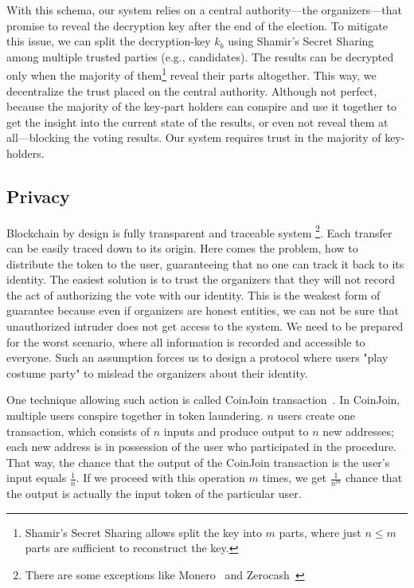 \documentclass[applsci,article,submit,moreauthors,pdftex]{Definitions/mdpi}
\begin{document}
With this schema, our system relies on a central authority––the organizers––that promise to reveal the decryption key after the end of the election. To mitigate this issue, we can split the decryption-key $k_b$ using Shamir's Secret Sharing~\cite{shamir1979share} among multiple trusted parties (e.g., candidates). The results can be decrypted only when the majority of them\footnote{ Shamir's Secret Sharing allows split the key into $m$ parts, where just $n \leq m$ parts are sufficient to reconstruct the key.} reveal their parts altogether.  This way, we decentralize the trust placed on the central authority. Although not perfect, because the majority of the key-part holders can conspire and use it together to get the insight into the current state of the results, or even not reveal them at all––blocking the voting results. Our system requires trust in the majority of key-holders.

\subsection{Privacy}
\label{privacy}
Blockchain by design is fully transparent and traceable system \footnote{There are some exceptions like Monero~\cite{van2013cryptonote} and Zerocash~\cite{sasson2014zerocash}}. Each transfer can be easily traced down to its origin. Here comes the problem, how to distribute the token to the user, guaranteeing that no one can track it back to its identity. The easiest solution is to trust the organizers that they will not record the act of authorizing the vote with our identity. This is the weakest form of guarantee because even if organizers are honest entities, we can not be sure that unauthorized intruder does not get access to the system. We need to be prepared for the worst scenario, where all information is recorded and accessible to everyone. Such an assumption forces us to design a protocol where users "play costume party" to mislead the organizers about their identity. 

One technique allowing such action is called CoinJoin transaction~\cite{CoinJoin41:online}. In CoinJoin, multiple users conspire together in token laundering. $n$ users create one transaction, which consists of $n$ inputs and produce output to $n$ new addresses; each new address is in possession of the user who participated in the procedure. That way, the chance that the output of the CoinJoin transaction is the user's input equals $\frac{1}{n}$. If we proceed with this operation $m$ times, we get $\frac{1}{n^m}$ chance that the output is actually the input token of the particular user. 
\end{document}
